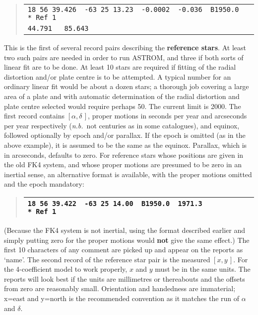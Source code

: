 \documentclass[twoside,11pt]{article}
\renewcommand{\_}{\texttt{\symbol{95}}}
\newcommand{\radec}     {$[\alpha,\delta\,]$}
\newcommand{\xy}        {$[x,y\,]$}
\begin{document}
\goodbreak
\begin{quote}
\begin{tabular}{|l|}
\hline
\verb|18 56 39.426  -63 25 13.23  -0.0002  -0.036  B1950.0  * Ref 1| \\
\verb|44.791   85.643| \\
\hline
\end{tabular}
\end{quote}

This is the first of several record pairs describing the \textbf{reference
stars}.  At least two such pairs are needed in order to run ASTROM,
and three if both sorts of linear fit are to be done.  At least 10 stars
are required if fitting of the radial distortion and/or plate centre is
to be attempted.  A typical number for an ordinary linear fit would be
about a dozen stars; a thorough job covering a large area of a plate
and with automatic determination of the radial distortion and plate
centre selected would require perhaps 50.  The current limit is 2000.
The first record contains \radec, proper motions in seconds per year and
arcseconds per year respectively (\textit{n.b.}\ not centuries as in some
catalogues), and equinox, followed optionally by epoch and/or parallax.
If the epoch is omitted (as in the above example), it is assumed to be the
same as the equinox.  Parallax, which is in arcseconds, defaults to zero.
For reference stars whose positions are given in the old FK4 system,
and whose proper motions are presumed to be zero in an inertial sense,
an alternative format is available, with the proper motions omitted and
the epoch mandatory:

\begin{quote}
\begin{tabular}{|l|}
\hline
\verb|18 56 39.422  -63 25 14.00  B1950.0  1971.3           * Ref 1| \\
\hline
\end{tabular}
\end{quote}

(Because the FK4 system is not inertial, using the format described
earlier and simply putting zero for the proper motions would \textbf{not}
give the same effect.)  The first 10 characters of any comment are
picked up and appear on the reports as `name'.  The second record of the
reference star pair is the measured \xy.  For the 4-coefficient model to
work properly, $x$ and $y$ must be in the same units.  The reports will
look best if the units are millimetres or thereabouts and the offsets from
zero are reasonably small.  Orientation and handedness are immaterial;
x=east and y=north is the recommended convention as it matches the run
of $\alpha$ and $\delta$.
\end{document}
